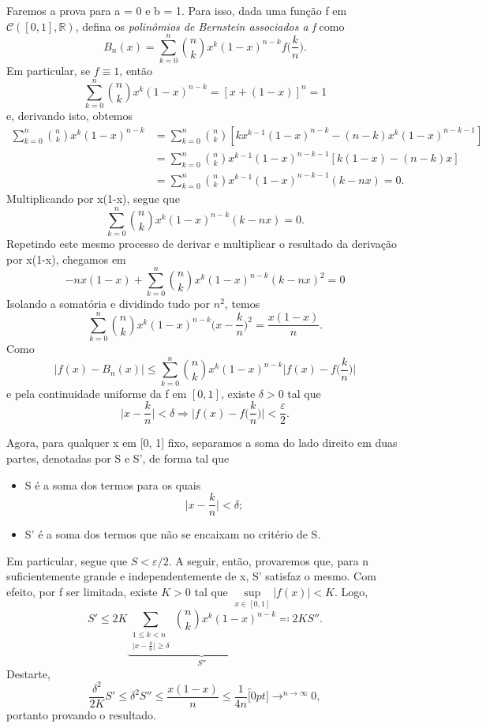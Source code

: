 \documentclass[../analysis_notes.tex]{subfiles}
\begin{document}
\begin{proof*}
	Faremos a prova para a = 0 e b = 1. Para isso, dada uma função f em \(\mathcal{C}([0, 1], \mathbb{R})\), defina os \textit{polinômios de Bernstein associados a f} como
	\[
		B_{n}(x)=\sum\limits_{k=0}^{n}\binom{n}{k} x^{k}(1-x)^{n-k}f \biggl(\frac{k}{n}\biggr).
	\]
	Em particular, se \(f\equiv 1\), então
	\[
		\sum\limits_{k=0}^{n}\binom{n}{k}x^{k}(1-x)^{n-k}=[x+(1-x)]^{n}=1
	\]
	e, derivando isto, obtemos
	\begin{align*}
		\sum\limits_{k=0}^{n}\binom{n}{k}x^{k}(1-x)^{n-k} & = \sum\limits_{k=0}^{n}\binom{n}{k}[kx^{k-1}(1-x)^{n-k}-(n-k)x^{k}(1-x)^{n-k-1}] \\
		                                                  & = \sum\limits_{k=0}^{n}\binom{n}{k}x^{k-1}(1-x)^{n-k-1}[k(1-x)-(n-k)x]           \\
		                                                  & = \sum\limits_{k=0}^{n}\binom{n}{k}x^{k-1}(1-x)^{n-k-1}(k-nx)= 0.
	\end{align*}
	Multiplicando por x(1-x), segue que
	\[
		\sum\limits_{k=0}^{n}\binom{n}{k}x^{k}(1-x)^{n-k}(k-nx)=0.
	\]
	Repetindo este mesmo processo de derivar e multiplicar o resultado da derivação por x(1-x), chegamos em
	\[
		-nx(1-x)+\sum\limits_{k=0}^{n}\binom{n}{k}x^{k}(1-x)^{n-k}(k-nx)^{2}=0
	\]
	Isolando a somatória e dividindo tudo por \(n^{2}\), temos
	\[
		\sum\limits_{k=0}^{n}\binom{n}{k}x^{k}(1-x)^{n-k}\biggl(x-\frac{k}{n}\biggr)^{2}=\frac{x(1-x)}{n}.
	\]
	Como
	\[
		|f(x)-B_{n}(x)|\leq \sum\limits_{k=0}^{n}\binom{n}{k}x^{k}(1-x)^{n-k}\biggl\vert f(x)-f \biggl(\frac{k}{n}\biggr) \biggr\vert
	\]
	e pela continuidade uniforme da f em \([0, 1]\), existe \(\delta >0\) tal que
	\[
		\biggl\vert x- \frac{k}{n} \biggr\vert < \delta \Rightarrow \biggl\vert f(x)-f \biggl(\frac{k}{n}\biggr) \biggr\vert < \frac{\varepsilon }{2}.
	\]

	Agora, para qualquer x em [0, 1] fixo, separamos a soma do lado direito em duas partes, denotadas por S e S', de forma tal que
	\begin{itemize}
		\item S é a  soma dos termos para os quais
		      \[
			      \biggl\vert x-\frac{k}{n} \biggr\vert < \delta ;
		      \]
		\item S' é a soma dos termos que não se encaixam no critério de S.
	\end{itemize}
	Em particular, segue que \(S<\varepsilon / 2\). A seguir, então, provaremos que, para n suficientemente grande e independentemente de x, S' satisfaz o mesmo. Com efeito, por f ser limitada, existe \(K>0\) tal que \(\sup\limits_{x\in [0,1]}|f(x)|<K.\) Logo,
	\[
		S' \leq 2K \underbrace{\sum\limits_{\substack{1\leq k<n\\\bigl\vert x-\frac{k}{n} \bigr\vert\geq \delta }}^{}\binom{n}{k} x^{k}(1-x)^{n-k}}_{S''}\eqqcolon 2KS''.
	\]
	Destarte,
	\[
		\frac{\delta ^{2}}{2K}S' \leq \delta ^{2}S'' \leq \frac{x(1-x)}{n}\leq \frac{1}{4n}\overbracket[0pt]{\longrightarrow}^{n\to \infty}0,
	\]
	portanto provando o resultado. \qedsymbol
\end{proof*}
\end{document}
